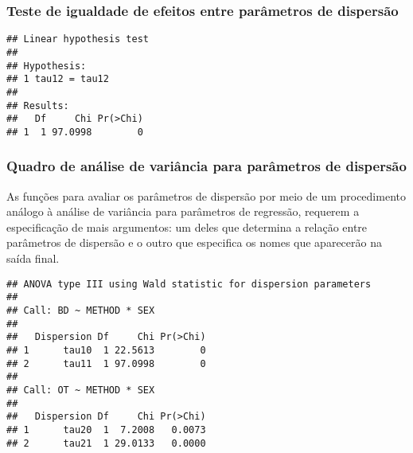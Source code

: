 \subsubsection{Teste de igualdade de efeitos entre parâmetros de dispersão}

\begin{knitrout}
\color{fgcolor}\begin{kframe}
\begin{alltt}
\hlstd{(} 
                      \hlstd{=} \hlstd{(}\hlstd{))}
\end{alltt}
\begin{verbatim}
## Linear hypothesis test
## 
## Hypothesis:               
## 1 tau12 = tau12
## 
## Results:
##   Df     Chi Pr(>Chi)
## 1  1 97.0998        0
\end{verbatim}
\end{kframe}
\end{knitrout}

\subsubsection{Quadro de análise de variância para parâmetros de dispersão}

As funções para avaliar os parâmetros de dispersão por meio de um procedimento análogo à análise de variância para parâmetros de regressão, requerem a especificação de mais argumentos: um deles que determina a relação entre parâmetros de dispersão e o outro que especifica os nomes que aparecerão na saída final.


\begin{knitrout}
\color{fgcolor}\begin{kframe}
\begin{alltt}
                     \hlstd{=} \hlstd{(}\hlstd{(}\hlstd{,}\hlstd{),} \hlstd{(}\hlstd{,}\hlstd{)),}
                     \hlstd{=} \hlstd{(}\hlstd{(}\hlstd{,} \hlstd{),}
                                 \hlstd{(}\hlstd{,} \hlstd{)))}
\end{alltt}
\begin{verbatim}
## ANOVA type III using Wald statistic for dispersion parameters
## 
## Call: BD ~ METHOD * SEX
## 
##   Dispersion Df     Chi Pr(>Chi)
## 1      tau10  1 22.5613        0
## 2      tau11  1 97.0998        0
## 
## Call: OT ~ METHOD * SEX
## 
##   Dispersion Df     Chi Pr(>Chi)
## 1      tau20  1  7.2008   0.0073
## 2      tau21  1 29.0133   0.0000
\end{verbatim}
\end{kframe}
\end{knitrout}

